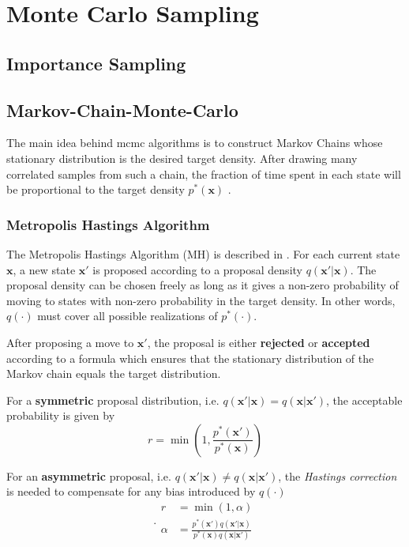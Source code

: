 
\chapter{Monte Carlo Sampling}\label{chap:mcmc}
\section{Importance Sampling}\label{sec:theory_importance_sampling}

\section{Markov-Chain-Monte-Carlo}
The main idea behind \acrfull{mcmc} algorithms is to construct Markov Chains whose stationary distribution is the desired target density. After drawing many correlated samples from such a chain, the fraction of time spent in each state will be proportional to the target density $p^*(\mathbf{x})$ \cite{murphy}. 

\subsection{Metropolis Hastings Algorithm}
The Metropolis Hastings Algorithm (MH) is described in \cite[p.~850]{murphy}.
For each current state $\mathbf{x}$, a new state $\mathbf{x'}$ is proposed according to a proposal density $q(\mathbf{x'} | \mathbf{x})$. The proposal density can be chosen freely as long as it gives a non-zero probability of moving to states with non-zero probability in the target density. In other words, $q(\cdot)$ must cover all possible realizations of $p^*(\cdot)$. 

After proposing a move to $\mathbf{x'}$, the proposal is either \textbf{rejected} or \textbf{accepted} according to a formula which ensures that the stationary distribution of the Markov chain equals the target distribution. 

For a \textbf{symmetric} proposal distribution, i.e. $q(\mathbf{x'} | \mathbf{x}) = q(\mathbf{x}| \mathbf{x'})$, the acceptable probability is given by 
\begin{equation}
    r = \min(1, \frac{p^*(\mathbf{x'})}{p^*(\mathbf{x})})
\end{equation}

For an \textbf{asymmetric} proposal, i.e. $q(\mathbf{x'} | \mathbf{x}) \neq q(\mathbf{x} | \mathbf{x'})$, the \textit{Hastings correction} is needed to compensate for any bias introduced by $q(\cdot)$
\begin{subequations}.
\begin{align}
    r &= \min(1, \alpha)\\
    \alpha &= \frac{p^*(\mathbf{x'}) q(\mathbf{x'} | \mathbf{x})}{p^*(\mathbf{x}) q(\mathbf{x}| \mathbf{x'})}\label{eq:mcmc_mh_acceptance}
\end{align}
\end{subequations}

